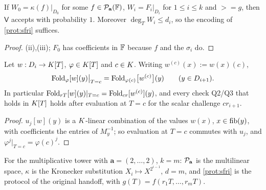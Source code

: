 \begin{corollary}[Completeness]\label{cor:completeness}
If $W_0=\kappa(f)|_{D_0}$ for some $f\in\mathcal{P}_{\mathbf a}(\mathbb{F})$, $W_i=F_i|_{D_i}$ for $1\le i\le k$ and
$\gt=g$, then $\mathsf V$ accepts with probability $1$. Moreover $\deg_TW_i\le d_i$, so the
encoding of \cref{prot:sfri} suffices.
\end{corollary}

\begin{proof}
(ii),(iii); $F_0$ has coefficients in $\mathbb{F}$ because $f$ and the $\sigma_i$ do.
\end{proof}

\begin{lemma}\label{lem:specialization}
Let $w:D_i\to K[T]$, $\varphi\in K[T]$ and $c\in K$. Writing $w^{(c)}(x):=w(x)(c)$,
\[
\mathrm{Fold}_{\varphi}[w](y)\big|_{T=c}=\mathrm{Fold}_{\varphi(c)}\bigl[w^{(c)}\bigr](y)\qquad(y\in D_{i+1}).
\]
In particular $\mathrm{Fold}_{rT}[w](y)|_{T=c}=\mathrm{Fold}_{cr}[w^{(c)}](y)$, and every check Q2/Q3 that
holds in $K[T]$ holds after evaluation at $T=c$ for the scalar challenge $cr_{i+1}$.
\end{lemma}

\begin{proof}
$u_j[w](y)$ is a $K$-linear combination of the values $w(x)$, $x\in\mathrm{fib}(y)$, with
coefficients the entries of $M_y^{-1}$; so evaluation at $T=c$ commutes with $u_j$, and
$\varphi^j|_{T=c}=\varphi(c)^j$.
\end{proof}

\begin{remark}\label{rem:binary}
For the multiplicative tower with $\mathbf a=(2,\dots,2)$, $k=m$: $\mathcal{P}_{\mathbf a}$ is the
multilinear space, $\kappa$ is the Kronecker substitution $X_i\mapsto X^{2^{i-1}}$, $d=m$,
and \cref{prot:sfri} is the protocol of the original handoff, with
$g(T)=f(r_1T,\dots,r_mT)$.
\end{remark}
